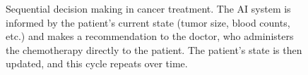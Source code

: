 \begin{figure}[htbp]
    \caption{Sequential decision making in cancer treatment. The AI system is informed by the patient's current state (tumor size, blood counts, etc.) and makes a recommendation to the doctor, who administers the chemotherapy directly to the patient. The patient's state is then updated, and this cycle repeats over time.}
    \label{fig:cancer-treatment-sdm}
\end{figure}

